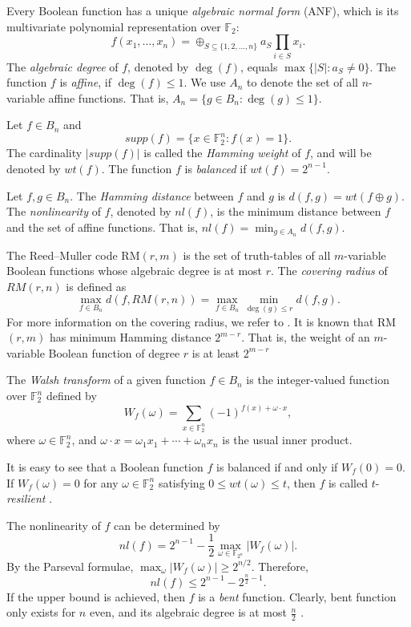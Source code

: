 \documentclass[11pt]{article}
\newtheorem{open problem}{Open problem}
\begin{document}
Every Boolean function has a unique {\em algebraic normal form} (ANF),
which is its multivariate polynomial representation over $\mathbb{F}_{2}$:
\[
f(x_1,\ldots ,x_n)=\oplus_{S\subseteq \{1,2,\ldots ,n\}}a_S\prod_{i\in S}x_i.
\]
 The {\em algebraic degree} of $f$, denoted by $\deg(f)$, equals $\max\{|S| :  a_S\neq 0 \}$. The function $f$ is {\em affine}, if $\deg(f)\le 1$. We use $A_n$ to denote the set of all $n$-variable affine functions. That is, $A_n=\{g\in B_n: \deg(g)\le 1\}$.

 Let $f\in B_n$ and
\[
supp(f)=\{x\in \mathbb{F}_{2}^{n}: f(x)=1\}.
  \]
 The cardinality $|supp(f)|$ is called the {\em Hamming weight} of $f$, and will be denoted by $wt(f)$. The function $f$ is  {\em balanced} if $wt(f)=2^{n-1}$.

Let $f, g\in B_n$. The {\em Hamming distance} between $f$ and $g$ is $d(f,g)=wt(f\oplus g)$. The {\em nonlinearity} of $f$, denoted by $nl(f)$, is the minimum distance between $f$ and the set of affine functions. That is, $nl(f)=\min_{g\in A_n} d(f,g)$.


The Reed--Muller code RM$(r,m)$ is the set of truth-tables of all $m$-variable Boolean functions whose
algebraic degree is at most $r$. The {\em covering radius} of $RM(r,n)$ is defined as
\[
\max_{f\in B_n}d(f,RM(r,n))=\max_{f\in B_n}\min_{\deg(g)\le r}d(f,g).
\]
For more information on the covering radius, we refer to \cite{Gao,Wang}. It is known that RM$(r,m)$ has minimum Hamming distance $2^{m-r}$. That is, the weight of an $m$-variable Boolean function of degree $r$ is at least $ 2^{m-r}$ \cite{Kasami1,MC}

 The {\em Walsh transform} of a given function $f \in B_n$ is the integer-valued function over $\mathbb{F}_{2}^n$
defined by
\[
W_f(\omega)=\sum_{x\in \mathbb{F}_{2}^n}(-1)^{f(x)+\omega \cdot x},
\]
where $\omega \in \mathbb{F}_{2}^n$, and $\omega \cdot x=\omega_1x_1+\cdots+\omega_nx_n$ is the usual inner product.

 It is easy to see that a Boolean function $f$ is  balanced if and only if $W_f(0)=0$.  If $W_f(\omega)=0$
for any $\omega\in \mathbb{F}_{2}^{n}$ satisfying $0\leq wt(\omega)\leq t$, then $f$ is called $t$-{\em resilient} \cite{Sun,Xiao}.

The nonlinearity of $f$ can be determined by
\[
nl(f)=2^{n-1}-\frac{1}{2}\max_{\omega \in \mathbb{F}_{2^n}}|W_f(\omega)|.
\]
By the Parseval formulae, $\max_{\omega}|W_f(\omega)|\ge 2^{n/2}$. Therefore,
\[
nl(f)\le 2^{n-1}-2^{\frac{n}{2}-1}.
\]
 If the upper bound is achieved, then $f$ is a {\em bent} function. Clearly, bent function only exists for $n$ even, and its algebraic degree is at most $\frac{n}{2}$ \cite{Car1,Car2,Rothaus}.
\end{document}
